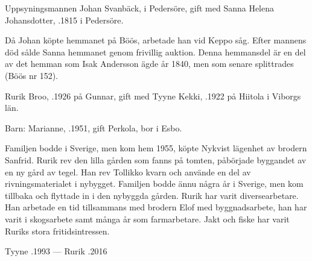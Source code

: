 %
Uppsyningsmannen Johan Svanbäck,  i Pedersöre, gift med Sanna Helena Johansdotter, .1815 i Pedersöre.
\begin{jhchildren}
  \item {}
  \item {}
  \item {}
  \item {}
\end{jhchildren}
Då Johan köpte hemmanet på Böös, arbetade han vid Keppo såg. Efter mannens död sålde Sanna hemmanet genom frivillig auktion. Denna hemmansdel är en del av det hemman som Isak Andersson ägde år 1840, men som senare splittrades (Böös nr 152).



%



%
Rurik Broo, .1926 på Gunnar, gift med Tyyne Kekki, .1922 på Hiitola i Viborgs län.

Barn: Marianne, .1951, gift Perkola, bor i Esbo.

Familjen bodde i Sverige, men kom hem 1955, köpte Nykvist lägenhet av brodern Sanfrid. Rurik rev den lilla gården som fanns på tomten, påbörjade byggandet av en ny gård av tegel. Han rev Tollikko kvarn och använde en del av rivningsmaterialet i nybygget. Familjen bodde 		 ännu några år i Sverige, men kom tillbaka och flyttade in i den nybyggda gården. Rurik har varit diversearbetare. Han arbetade en tid tillsammans med brodern Elof med byggnadsarbete, han har varit i skogsarbete samt många år som farmarbetare. Jakt och fiske har varit Ruriks stora fritidsintressen.

Tyyne .1993  ---  Rurik .2016


%



